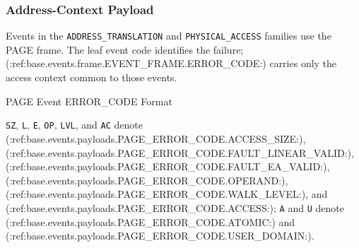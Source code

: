 \subsubsection{Address-Context Payload}
Events in the \texttt{ADDRESS\_TRANSLATION} and \texttt{PHYSICAL\_ACCESS} families use the PAGE frame. The leaf
event code identifies the failure; (:ref:base.events.frame.EVENT_FRAME.ERROR_CODE:) carries only the access context common to those events.

\begin{BedrockListedFormatDiagram}{PAGE Event ERROR\_CODE Format}
\end{BedrockListedFormatDiagram}
{\small
\texttt{SZ}, \texttt{L}, \texttt{E}, \texttt{OP}, \texttt{LVL}, and \texttt{AC} denote
(:ref:base.events.payloads.PAGE_ERROR_CODE.ACCESS_SIZE:), (:ref:base.events.payloads.PAGE_ERROR_CODE.FAULT_LINEAR_VALID:), (:ref:base.events.payloads.PAGE_ERROR_CODE.FAULT_EA_VALID:),
(:ref:base.events.payloads.PAGE_ERROR_CODE.OPERAND:), (:ref:base.events.payloads.PAGE_ERROR_CODE.WALK_LEVEL:), and (:ref:base.events.payloads.PAGE_ERROR_CODE.ACCESS:); \texttt{A} and \texttt{U} denote
(:ref:base.events.payloads.PAGE_ERROR_CODE.ATOMIC:) and (:ref:base.events.payloads.PAGE_ERROR_CODE.USER_DOMAIN:).
\par}


